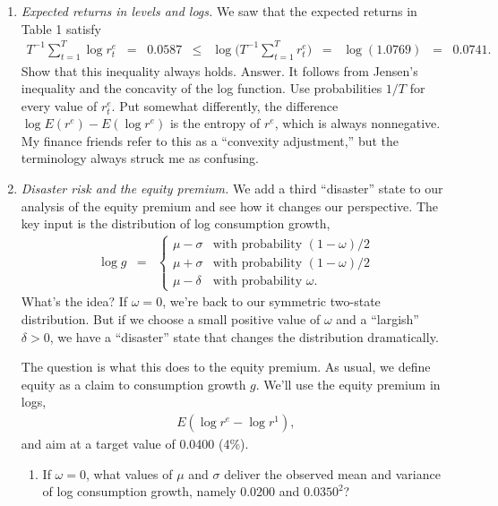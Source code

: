 \documentclass[11pt]{article}
\begin{document}
\begin{enumerate}
\item {\it Expected returns in levels and logs.\/}
We saw that the expected returns in Table 1 satisfy
\begin{eqnarray*}
    T^{-1} \sum_{t=1}^T \log r^e_t \;\;=\;\; 0.0587
        &\leq& \log \Big( T^{-1} \sum_{t=1}^T r^e_t \Big) \;\;=\;\; \log (1.0769)
        \;\;=\;\; 0.0741 .
\end{eqnarray*}
Show that this inequality always holds.
%
Answer.
It follows from Jensen's inequality and the concavity of the log function.
Use probabilities $1/T$ for every value of $r^e_t$.
Put somewhat differently, the difference
$ \log E (r^e) - E (\log r^e) $ is the entropy of $r^e$,
which is always nonnegative.
My finance friends refer to this as a ``convexity adjustment,''
but the terminology always struck me as confusing.

\item {\it Disaster risk and the equity premium.\/}
We add a third ``disaster'' state to our analysis of the equity premium
and see how it changes our perspective.
The key input is the distribution of log consumption growth,
\begin{eqnarray*}
    \log g &=& \left\{
                \begin{array}{ll}
                \mu - \sigma & \mbox{with probability } (1-\omega)/2 \\
                \mu + \sigma & \mbox{with probability } (1-\omega)/2 \\
                \mu - \delta & \mbox{with probability } \omega .
                \end{array}
                \right.
\end{eqnarray*}
What's the idea?
If $\omega = 0$, we're back to our symmetric two-state distribution.
But if we choose a small positive value of $\omega$ and a ``largish'' $\delta>0$,
we have a ``disaster'' state that changes the distribution dramatically.

The question is what this does to the equity premium.
As usual, we define equity as a claim to consumption growth $g$.
We'll use the equity premium in logs,
\begin{eqnarray*}
    E ( \log r^e - \log r^1 ) ,
\end{eqnarray*}
and aim at a target value of 0.0400 (4\%).

\begin{enumerate}
\item If $\omega = 0$, what values of $\mu$ and $\sigma$ deliver
the observed mean and variance of log consumption growth, namely
0.0200 and $0.0350^2$?


\end{enumerate}
\end{enumerate}
\end{document}
